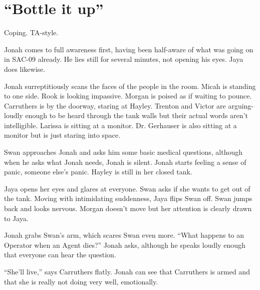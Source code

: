 \setcounter{chapter}{ 25 }
\chapter{\textbf{``Bottle it up''} }








Coping.  TA-style.



\noindent\hrulefill





Jonah comes to full awareness first, having been half-aware of what was going on in SAC-09 already.  He lies still for several minutes, not opening his eyes.  Jaya does likewise.



Jonah surreptitiously scans the faces of the people in the room.  Micah is standing to one side.  Rook is looking impassive.  Morgan is poised as if waiting to pounce.  Carruthers is by the doorway, staring at Hayley.  Trenton and Victor are arguing- loudly enough to be heard through the tank walls but their actual words aren't intelligible.  Larissa is sitting at a monitor.  Dr. Gerhauser is also sitting at a monitor but is just staring into space.



Swan approaches Jonah and asks him some basic medical questions, although when he asks what Jonah needs, Jonah is silent.  Jonah starts feeling a sense of panic, someone else's panic.  Hayley is still in her closed tank.



Jaya opens her eyes and glares at everyone.  Swan asks if she wants to get out of the tank.  Moving with intimidating suddenness, Jaya flips Swan off.  Swan jumps back and looks nervous.  Morgan doesn't move but her attention is clearly drawn to Jaya.



Jonah grabs Swan's arm, which scares Swan even more.  ``What happens to an Operator when an Agent dies?'' Jonah asks, although he speaks loudly enough that everyone can hear the question.

``She'll live,'' says Carruthers flatly.   Jonah can see that Carruthers is armed and that she is really not doing very well, emotionally.



